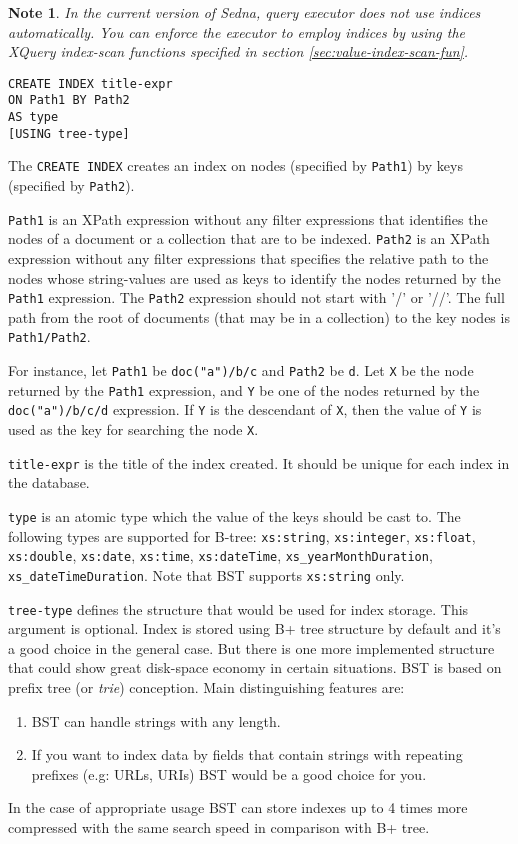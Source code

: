\documentclass[a4paper,12pt]{article}
\newtheorem{note}{Note}    %
\begin{document}
\begin{note} In the current version of Sedna, query executor does not use
indices automatically. You can enforce the executor to employ indices by using
the XQuery index-scan functions specified in section
\ref{sec:value-index-scan-fun}.
\end{note}

\begin{verbatim}
CREATE INDEX title-expr
ON Path1 BY Path2
AS type
[USING tree-type]
\end{verbatim}

The \verb!CREATE INDEX! creates an index on nodes (specified by \verb!Path1!) by
keys (specified by \verb!Path2!).

\verb!Path1! is an XPath expression without any filter expressions that
identifies the nodes of a document or a collection that are to be indexed.
\verb!Path2! is an XPath expression without any filter expressions that
specifies the relative path to the nodes whose string-values are used as keys to
identify the nodes returned by the \verb!Path1! expression. The \verb!Path2!
expression should not start with '/' or '//'. The full path from the root of
documents (that may be in a collection) to the key nodes is \verb!Path1/Path2!.

For instance, let \verb!Path1! be \verb!doc("a")/b/c! and \verb!Path2! be
\verb!d!. Let \verb!X! be the node returned by the \verb!Path1! expression, and
\verb!Y! be one of the nodes returned by the \verb!doc("a")/b/c/d! expression.
If \verb!Y! is the descendant of \verb!X!, then the value of \verb!Y! is used as
the key for searching the node \verb!X!.

\verb!title-expr! is the title of the index created. It should be unique for
each index in the database.

\verb!type! is an atomic type which the value of the keys should be cast to. The
following types are supported for B-tree: \verb!xs:string!, \verb!xs:integer!,
\verb!xs:float!, \verb!xs:double!, \verb!xs:date!, \verb!xs:time!,
\verb!xs:dateTime!, \verb!xs_yearMonthDuration!, \verb!xs_dateTimeDuration!.
Note that BST supports \verb!xs:string! only.

\verb!tree-type! defines the structure that would be used for index storage.
This argument is optional. Index is stored using B+ tree structure by default
and it's a good choice in the general case. But there is one more implemented
structure that could show great disk-space economy in certain situations. BST is
based on prefix tree (or \emph{trie}) conception. Main distinguishing features
are:
\begin{enumerate}
\item {BST can handle strings with any length.}
\item {If you want  to index data by fields that contain strings with repeating
prefixes (e.g: URLs, URIs) BST would be a good choice for you.}
\end{enumerate}
In the case of appropriate usage BST can store indexes up to 4 times more
compressed with the same search speed in comparison with B+ tree.
\end{document}
